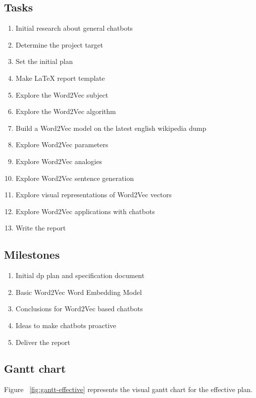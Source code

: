 \subsection{Tasks}
\begin{enumerate}
    \setlength\itemsep{0em}
    \item Initial research about general chatbots
    \item Determine the project target
    \item Set the initial plan
    \item Make LaTeX report template
    \item Explore the Word2Vec subject
    \item Explore the Word2Vec algorithm
    \item Build a Word2Vec model on the latest english wikipedia dump
    \item Explore Word2Vec parameters
    \item Explore Word2Vec analogies
    \item Explore Word2Vec sentence generation
    \item Explore visual representations of Word2Vec vectors
    \item Explore Word2Vec applications with chatbots
    \item Write the report
    
\end{enumerate}

\subsection{Milestones}
\begin{enumerate}
    \setlength\itemsep{0em}
    \item Initial \gls{dp} plan and specification document
    \item Basic Word2Vec Word Embedding Model
    \item Conclusions for Word2Vec based chatbots
    \item Ideas to make chatbots proactive
    \item Deliver the report
\end{enumerate}

\subsection{Gantt chart}
Figure ~\ref{fig:gantt-effective} represents the visual gantt chart for the effective plan.


